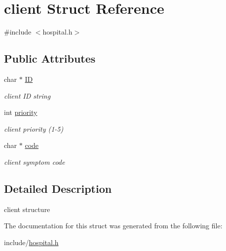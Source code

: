 \hypertarget{structclient}{}\section{client Struct Reference}
\label{structclient}


{\ttfamily \#include $<$hospital.\+h$>$}

\subsection*{Public Attributes}
\begin{DoxyCompactItemize}
\item 
\mbox{\label{structclient_a95387cea00046cb6565c3e42760f5316}} 
char $\ast$ \hyperlink{structclient_a95387cea00046cb6565c3e42760f5316}{ID}
\begin{DoxyCompactList}\small\item\em client ID string \end{DoxyCompactList}\item 
\mbox{\label{structclient_afe566cb606bafb92609c20efa920b49b}} 
int \hyperlink{structclient_afe566cb606bafb92609c20efa920b49b}{priority}
\begin{DoxyCompactList}\small\item\em client priority (1-\/5) \end{DoxyCompactList}\item 
\mbox{\label{structclient_a94d3f269ee8fb0ae4bb2335a14d96a96}} 
char $\ast$ \hyperlink{structclient_a94d3f269ee8fb0ae4bb2335a14d96a96}{code}
\begin{DoxyCompactList}\small\item\em client symptom code \end{DoxyCompactList}\end{DoxyCompactItemize}


\subsection{Detailed Description}
client structure 

The documentation for this struct was generated from the following file\+:\begin{DoxyCompactItemize}
\item 
include/\hyperlink{hospital_8h}{hospital.\+h}\end{DoxyCompactItemize}
